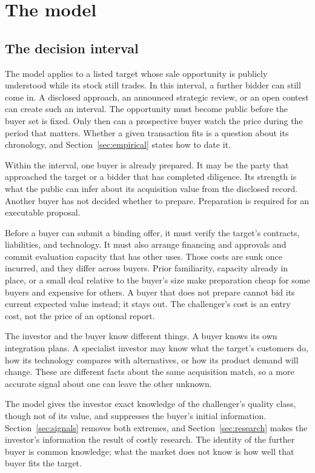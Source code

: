 \section{The model}\label{sec:model}

\subsection{The decision interval}\label{sec:interval}

The model applies to a listed target whose sale opportunity is publicly understood while its stock still
trades. In this interval, a further bidder can still come in. A disclosed approach, an announced strategic
review, or an open contest can create such an interval. The opportunity must become public before the buyer
set is fixed. Only then can a prospective buyer watch the price during the period that matters. Whether a
given transaction fits is a question about its chronology, and Section~\ref{sec:empirical} states how to date it.

Within the interval, one buyer is already prepared. It may be the party that approached the target or a
bidder that has completed diligence. Its strength is what the public can infer about its acquisition value from the disclosed
record. Another buyer has not decided whether to prepare. Preparation is required for an executable proposal.

Before a buyer can submit a binding offer, it must verify the target's contracts, liabilities, and technology.
It must also arrange financing and approvals and commit evaluation capacity that has other uses. Those costs
are sunk once incurred, and they differ across buyers. Prior familiarity, capacity already in place, or a small deal
relative to the buyer's size make preparation cheap for some buyers and expensive for others. A buyer that
does not prepare cannot bid its current expected value instead; it stays out. The challenger's cost is an
entry cost, not the price of an optional report.

The investor and the buyer know different things. A buyer knows its own integration plans. A specialist
investor may know what the target's customers do, how its technology compares with alternatives, or how
its product demand will change. These are different facts about the same acquisition match, so a more
accurate signal about one can leave the other unknown.

The model gives the investor exact knowledge of the challenger's quality class, though not of its value, and
suppresses the buyer's initial information. Section~\ref{sec:signals} removes both extremes, and
Section~\ref{sec:research} makes the investor's information the result of costly research. The identity of the
further buyer is common knowledge; what the market does not know is how well that buyer fits the target.

